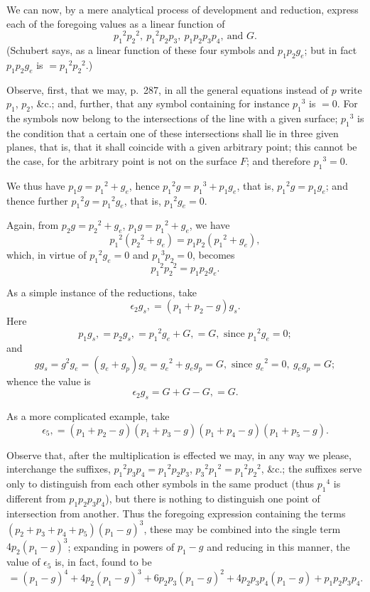 \documentclass[11pt,a4paper]{book}
\begin{document}
\newpage
We can now, by a mere analytical process of development and reduction, express each of the foregoing values as a linear function of
\[
{p_1}^2{p_2}^2,\ {p_1}^2p_2p_3,\ p_1p_2p_3p_4,\ \text{and } G.
\]
(Schubert says, as a linear function of these four symbols and $p_1p_2g_e$; but in fact $p_1p_2g_e$ is $= {p_1}^2{p_2}^2$.)

Observe, first, that we may, p.\ 287, in all the general equations instead of $p$ write $p_1$, $p_2$, \&c.; and, further, that any symbol containing for instance ${p_1}^3$ is $= 0$. For the symbols now belong to the intersections of the line with a given surface; ${p_1}^3$ is the condition that a certain one of these intersections shall lie in three given planes, that is, that it shall coincide with a given arbitrary point; this cannot be the case, for the arbitrary point is not on the surface $F$; and therefore ${p_1}^3 = 0$.

We thus have $p_1g = {p_1}^2 + g_e$, hence ${p_1}^2g = {p_1}^3 + p_1g_e$, that is, ${p_1}^2g = p_1g_e$; and thence further ${p_1}^2g = {p_1}^2g_e$, that is, ${p_1}^2g_e = 0$.

Again, from $p_2g = {p_2}^2 + g_e$, $p_1g = {p_1}^2 + g_e$, we have
\[
{p_1}^2({p_2}^2 + g_e) = p_1p_2({p_1}^2 + g_e),
\]
which, in virtue of ${p_1}^2g_e = 0$ and ${p_1}^3p_2 = 0$, becomes
\[
{p_1}^2{p_2}^2 = p_1p_2g_e.
\]

As a simple instance of the reductions, take
\[
\epsilon_2 g_s, = (p_1 + p_2 - g)g_s.
\]
Here
\[
p_1g_s, = p_2g_s, = {p_1}^2g_e + G, = G, \text{ since } {p_1}^2g_e = 0;
\]
and
\[
gg_s = g^2g_e = (g_e + g_p)g_e = {g_e}^2 + g_eg_p = G, \text{ since } {g_e}^2 = 0,\ g_eg_p = G;
\]
whence the value is
\[
\epsilon_2 g_s = G + G - G, = G.
\]

As a more complicated example, take
\[
\epsilon_5, = (p_1 + p_2 - g)(p_1 + p_3 - g)(p_1 + p_4 - g)(p_1 + p_5 - g).
\]

Observe that, after the multiplication is effected we may, in any way we please, interchange the suffixes, ${p_1}^2p_3p_4 = {p_1}^2p_2p_3$, ${p_3}^2{p_1}^2 = {p_1}^2{p_2}^2$, \&c.; the suffixes serve only to distinguish from each other symbols in the same product (thus ${p_1}^4$ is different from $p_1p_2p_3p_4$), but there is nothing to distinguish one point of intersection from another. Thus the foregoing expression containing the terms $(p_2 + p_3 + p_4 + p_5)(p_1 - g)^3$, these may be combined into the single term $4p_2(p_1 - g)^3$; expanding in powers of $p_1 - g$ and reducing in this manner, the value of $\epsilon_5$ is, in fact, found to be
\[
= (p_1 - g)^4 + 4p_2(p_1 - g)^3 + 6p_2p_3(p_1 - g)^2 + 4p_2p_3p_4(p_1 - g) + p_1p_2p_3p_4.
\]
\end{document}
